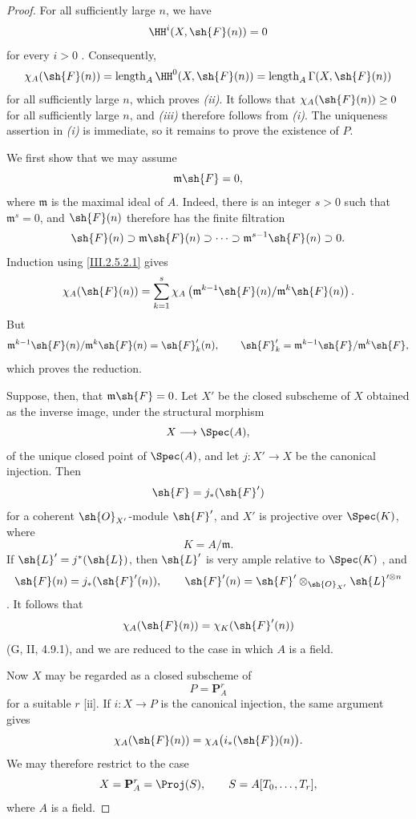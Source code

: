 \begin{proof}
For all sufficiently large $n$, we have
\[
  \HH^i(X,\sh{F}(n))=0
\]
for every $i>0$ .
Consequently,
\[
  \chi_A(\sh{F}(n))
  =
  \operatorname{length}_A\HH^0(X,\sh{F}(n))
  =
  \operatorname{length}_A\Gamma(X,\sh{F}(n))
\]
for all sufficiently large $n$, which proves \emph{(ii)}.
It follows that $\chi_A(\sh{F}(n))\geq0$ for all sufficiently large $n$, and \emph{(iii)} therefore follows from \emph{(i)}.
The uniqueness assertion in \emph{(i)} is immediate, so it remains to prove the existence of $P$.

We first show that we may assume
\[
  \mathfrak{m}\sh{F}=0,
\]
where $\mathfrak{m}$ is the maximal ideal of $A$.
Indeed, there is an integer $s>0$ such that $\mathfrak{m}^s=0$, and $\sh{F}(n)$ therefore has the finite filtration
\[
  \sh{F}(n)
  \supset\mathfrak{m}\sh{F}(n)
  \supset\cdots
  \supset\mathfrak{m}^{s-1}\sh{F}(n)
  \supset0.
\]
Induction using \eqref{III.2.5.2.1} gives
\[
  \chi_A(\sh{F}(n))
  =
  \sum_{k=1}^{s}
  \chi_A\left(
    \mathfrak{m}^{k-1}\sh{F}(n)/
    \mathfrak{m}^{k}\sh{F}(n)
  \right).
\]
But
\[
  \mathfrak{m}^{k-1}\sh{F}(n)/
  \mathfrak{m}^{k}\sh{F}(n)
  =
  \sh{F}'_k(n),
  \qquad
  \sh{F}'_k=
  \mathfrak{m}^{k-1}\sh{F}/\mathfrak{m}^{k}\sh{F},
\]
which proves the reduction.

Suppose, then, that $\mathfrak{m}\sh{F}=0$.
Let $X'$ be the closed subscheme of $X$ obtained as the inverse image, under the structural morphism
\[
  X\longrightarrow\Spec(A),
\]
of the unique closed point of $\Spec(A)$, and let $j:X'\to X$ be the canonical injection.
Then
\[
  \sh{F}=j_*(\sh{F}')
\]
for a coherent $\sh{O}_{X'}$-module $\sh{F}'$, and $X'$ is projective over $\Spec(K)$, where
\[
  K=A/\mathfrak{m}.
\]
If $\sh{L}'=j^*(\sh{L})$, then $\sh{L}'$ is very ample relative to $\Spec(K)$ , and
\[
  \sh{F}(n)=j_*(\sh{F}'(n)),
  \qquad
  \sh{F}'(n)
  =
  \sh{F}'\otimes_{\sh{O}_{X'}}\sh{L}'^{\otimes n}
\]
.
It follows that
\[
  \chi_A(\sh{F}(n))
  =
  \chi_K(\sh{F}'(n))
\]
(G, II, 4.9.1), and we are reduced to the case in which $A$ is a field.

Now $X$ may be regarded as a closed subscheme of
\[
  P=\mathbf{P}_A^r
\]
for a suitable $r$ [ii].
If $i:X\to P$ is the canonical injection, the same argument gives
\[
  \chi_A(\sh{F}(n))
  =
  \chi_A\bigl(i_*(\sh{F})(n)\bigr).
\]
We may therefore restrict to the case
\[
  X=\mathbf{P}_A^r=\Proj(S),
  \qquad
  S=A[T_0,\ldots,T_r],
\]
where $A$ is a field.


\end{proof}
